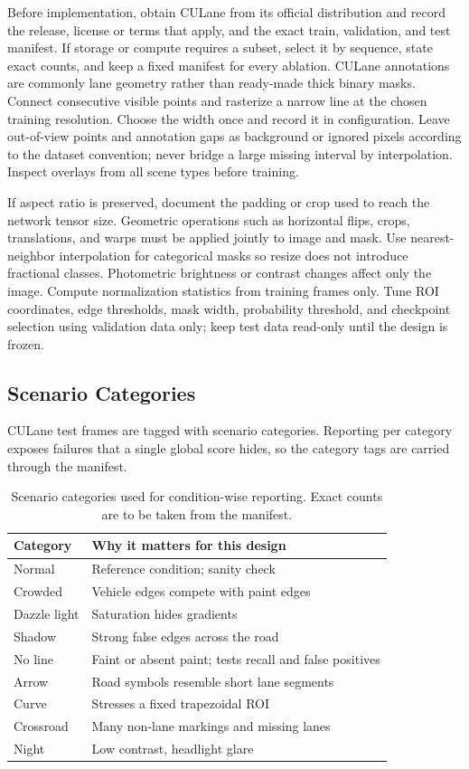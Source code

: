\documentclass[10pt,a4paper,twocolumn]{article}
\begin{document}
Before implementation, obtain CULane from its official distribution and record the release, license or terms that apply, and the exact train, validation, and test manifest. If storage or compute requires a subset, select it by sequence, state exact counts, and keep a fixed manifest for every ablation. CULane annotations are commonly lane geometry rather than ready-made thick binary masks. Connect consecutive visible points and rasterize a narrow line at the chosen training resolution. Choose the width once and record it in configuration. Leave out-of-view points and annotation gaps as background or ignored pixels according to the dataset convention; never bridge a large missing interval by interpolation. Inspect overlays from all scene types before training.

If aspect ratio is preserved, document the padding or crop used to reach the network tensor size. Geometric operations such as horizontal flips, crops, translations, and warps must be applied jointly to image and mask. Use nearest-neighbor interpolation for categorical masks so resize does not introduce fractional classes. Photometric brightness or contrast changes affect only the image. Compute normalization statistics from training frames only. Tune ROI coordinates, edge thresholds, mask width, probability threshold, and checkpoint selection using validation data only; keep test data read-only until the design is frozen.

\subsection{Scenario Categories}
CULane test frames are tagged with scenario categories. Reporting per category exposes failures that a single global score hides, so the category tags are carried through the manifest.

\begin{table}[H]
\centering
\caption{Scenario categories used for condition-wise reporting. Exact counts are to be taken from the manifest.}
\footnotesize
\begin{tabularx}{\columnwidth}{|l|X|}
\hline
\rowcolor{gray!18}\textbf{Category}&\textbf{Why it matters for this design}\\ \hline
Normal & Reference condition; sanity check\\ \hline
Crowded & Vehicle edges compete with paint edges\\ \hline
Dazzle light & Saturation hides gradients\\ \hline
Shadow & Strong false edges across the road\\ \hline
No line & Faint or absent paint; tests recall and false positives\\ \hline
Arrow & Road symbols resemble short lane segments\\ \hline
Curve & Stresses a fixed trapezoidal ROI\\ \hline
Crossroad & Many non-lane markings and missing lanes\\ \hline
Night & Low contrast, headlight glare\\ \hline
\end{tabularx}
\end{table}
\end{document}
